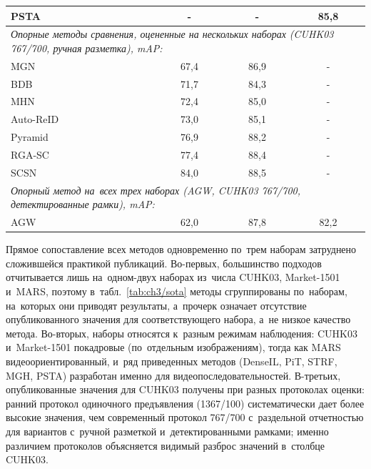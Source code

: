 \begin{table}[htbp]
{\begin{tabular}{lccc}
PSTA~\cite{Wang2021psta} & - & - & 85,8 \\
\hline
\multicolumn{4}{l}{\textit{Опорные методы сравнения, оцененные на нескольких наборах (CUHK03 767/700, ручная разметка), mAP:}} \\
MGN~\cite{Wang2018mgn} & 67,4 & 86,9 & - \\
BDB~\cite{Dai2019bdb} & 71,7 & 84,3 & - \\
MHN~\cite{Chen2019mhn} & 72,4 & 85,0 & - \\
Auto-ReID~\cite{Quan2019autoreid} & 73,0 & 85,1 & - \\
Pyramid~\cite{Zheng2019pyramid} & 76,9 & 88,2 & - \\
RGA-SC~\cite{Zhang2020rga} & 77,4 & 88,4 & - \\
SCSN~\cite{Chen2020scsn} & 84,0 & 88,5 & - \\
\hline
\multicolumn{4}{l}{\textit{Опорный метод на~всех трех наборах (AGW, CUHK03 767/700, детектированные рамки), mAP:}} \\
AGW~\cite{Ye2021reidsurvey} & 62,0 & 87,8 & 82,2 \\
\hline
\end{tabular}}
\end{table}

Прямое сопоставление всех методов одновременно по~трем наборам затруднено
сложившейся практикой публикаций. Во-первых, большинство подходов
отчитывается лишь на~одном-двух наборах из~числа CUHK03, Market-1501
и~MARS, поэтому в~табл.~\ref{tab:ch3/sota} методы сгруппированы
по~наборам, на~которых они приводят результаты, а~прочерк означает
отсутствие опубликованного значения для соответствующего набора, а~не
низкое качество метода. Во-вторых, наборы относятся к~разным режимам
наблюдения: CUHK03 и~Market-1501 покадровые (по~отдельным изображениям),
тогда как MARS видеоориентированный, и~ряд приведенных методов (DenseIL,
PiT, STRF, MGH, PSTA) разработан именно для видеопоследовательностей.
В-третьих, опубликованные значения для CUHK03 получены при разных
протоколах оценки: ранний протокол одиночного предъявления (1367/100) систематически
дает более высокие значения, чем современный протокол 767/700
с~раздельной отчетностью для вариантов с~ручной разметкой и~детектированными рамками; именно
различием протоколов объясняется видимый разброс значений в~столбце
CUHK03.

